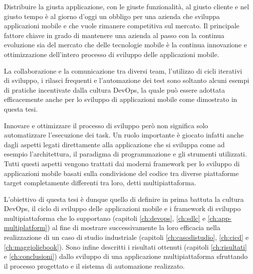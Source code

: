 
Distribuire la giusta applicazione, con le giuste funzionalità, al giusto cliente e nel giusto tempo è al giorno d'oggi un obbligo per una azienda che sviluppa applicazioni mobile e che vuole rimanere competitiva sul mercato. Il principale fattore chiave in grado di mantenere una azienda al passo con la continua evoluzione sia del mercato che delle tecnologie mobile è la continua innovazione e ottimizzazione dell'intero processo di sviluppo delle applicazioni mobile.

La collaborazione e la comunicazione tra diversi team, l'utilizzo di cicli iterativi di sviluppo, i rilasci frequenti e l'automazione dei test sono soltanto alcuni esempi di pratiche incentivate dalla cultura DevOps, la quale può essere adottata efficacemente anche per lo sviluppo di applicazioni mobile come dimostrato in questa tesi.

Innovare e ottimizzare il processo di sviluppo però non significa solo automatizzare l'esecuzione dei task. Un ruolo importante è giocato infatti anche dagli aspetti legati direttamente alla applicazione che si sviluppa come ad esempio l'architettura, il paradigma di programmazione e gli strumenti utilizzati. Tutti questi aspetti vengono trattati dai moderni framework per lo sviluppo di applicazioni mobile basati sulla condivisione del codice tra diverse piattaforme target completamente differenti tra loro, detti multipiattaforma.

L'obiettivo di questa tesi è dunque quello di definire in prima battuta la cultura DevOps, il ciclo di sviluppo delle applicazioni mobile e i framework di sviluppo multipiattaforma che lo supportano (capitoli \ref{ch:devops}, \ref{ch:sdlc} e \ref{ch:app-multiplatform}) al fine di mostrare successivamente la loro efficacia nella realizzazione di un caso di studio industriale (capitoli \ref{ch:casodistudio}, \ref{ch:cicd} e \ref{ch:maggioliebook}). Sono infine descritti i risultati ottenuti (capitoli \ref{ch:risultati} e \ref{ch:conclusioni}) dallo sviluppo di una applicazione multipiattaforma sfruttando il processo progettato e il sistema di automazione realizzato.
